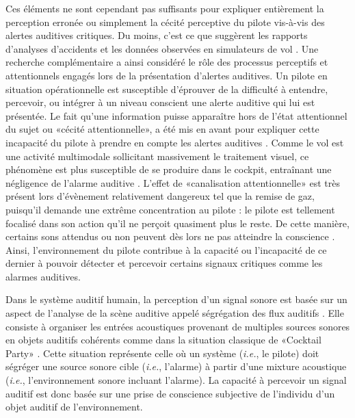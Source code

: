 Ces éléments ne sont cependant pas suffisants pour expliquer entièrement la perception erronée ou simplement la cécité perceptive du pilote vis-à-vis des alertes auditives critiques. 
Du moins, c'est ce que suggèrent les rapports d'analyses d'accidents \citep{bea1993accident, bliss2003investigation} et les données observées en simulateurs de vol \citep{dehais2012missing, dehais2014failure, dehais2017eeg}. 
Une recherche complémentaire a ainsi considéré le rôle des processus perceptifs et attentionnels engagés lors de la présentation d'alertes auditives. 
Un pilote en situation opérationnelle est susceptible d'éprouver de la difficulté à entendre, percevoir, ou intégrer à un niveau conscient une alerte auditive qui lui est présentée. 
Le fait qu'une information puisse apparaître hors de l'état attentionnel du sujet ou «cécité attentionnelle», a été mis en avant pour expliquer cette incapacité du pilote à prendre en compte les alertes auditives \citep{dehais2014failure, dehais2017eeg, dehais2019inattentional, scannella2013effects}. 
Comme le vol est une activité multimodale sollicitant massivement le traitement visuel, ce phénomène est plus susceptible de se produire dans le cockpit, entraînant une négligence de l'alarme auditive \citep{scannella2018auditory}. 
L'effet de «canalisation attentionnelle» est très présent lors d'évènement relativement dangereux tel que la remise de gaz, puisqu'il demande une extrême concentration au pilote : le pilote est tellement focalisé dans son action qu'il ne perçoit quasiment plus le reste. 
De cette manière, certains sons attendus ou non peuvent dès lors ne pas atteindre la conscience \citep{dehais2017eeg, molloy2015inattentional, macdonald2011visual, raveh2015load}. 
Ainsi, l'environnement du pilote contribue à la capacité ou l'incapacité de ce dernier à pouvoir détecter et percevoir certains signaux critiques comme les alarmes auditives. 

Dans le système auditif humain, la perception d'un signal sonore est basée sur un aspect de l’analyse de la scène auditive appelé ségrégation des flux auditifs \citep{bregman1994auditory}.
Elle consiste à organiser les entrées acoustiques provenant de multiples sources sonores en objets auditifs cohérents comme dans la situation classique de «Cocktail Party» \citep{cherry1953some, mcdermott2009cocktail}.
Cette situation représente celle où un système (\textit{i.e.}, le pilote) doit ségréger une source sonore cible (\textit{i.e.}, l'alarme) à partir d’une mixture acoustique (\textit{i.e.}, l'environnement sonore incluant l'alarme). 
La capacité à percevoir un signal auditif est donc basée sur une prise de conscience subjective de l'individu d'un objet auditif de l'environnement. 

